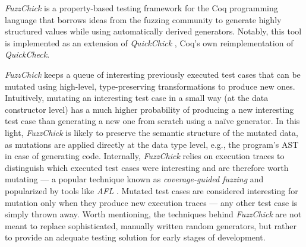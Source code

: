 \documentclass[acmsmall, anonymous]{acmart}
\newcommand{\quickcheck}{\textit{QuickCheck}\xspace}
\newcommand{\quickchick}{\textit{QuickChick}\xspace}
\newcommand{\fuzzchick}{\textit{FuzzChick}\xspace}
\begin{document}
\fuzzchick \cite{lampropoulos2019coverage} is a property-based testing framework
for the Coq programming language that borrows ideas from the fuzzing community
to generate highly structured values while using automatically derived
generators.
%
Notably, this tool is implemented as an extension of \quickchick
\cite{denes2014quickchick}, Coq's own reimplementation of \quickcheck.


\fuzzchick keeps a queue of interesting previously executed test cases that can
be mutated using high-level, type-preserving transformations to produce new
ones.
%
Intuitively, mutating an interesting test case in a small way (at the data
constructor level) has a much higher probability of producing a new interesting
test case than generating a new one from scratch using a na\"ive generator.
%
In this light, \fuzzchick is likely to preserve the semantic structure of the
mutated data, as mutations are applied directly at the data type level, e.g.,
the program's AST in case of generating code.
%
Internally, \fuzzchick relies on execution traces to distinguish which executed
test cases were interesting and are therefore worth mutating --- a popular
technique known as \emph{coverage-guided fuzzing} and popularized by tools like
\emph{AFL} \cite{afl}.
%
Mutated test cases are considered interesting for mutation only when they
produce new execution traces --- any other test case is simply thrown away.
%
Worth mentioning, the techniques behind \fuzzchick are not meant to replace
sophisticated, manually written random generators, but rather to provide an
adequate testing solution for early stages of development.
\end{document}
